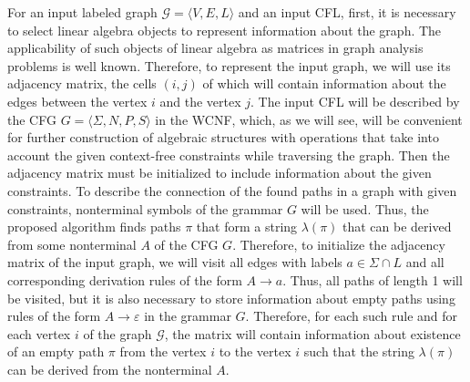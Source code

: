 For an input labeled graph $\mathcal{G} = \langle V, E, L\rangle$ and an input CFL, first, it is necessary to select linear algebra objects to represent information about the graph. The applicability of such objects of linear algebra as matrices in graph analysis problems is well known. Therefore, to represent the input graph, we will use its adjacency matrix, the cells $(i, j)$ of which will contain information about the edges between the vertex $i$ and the vertex $j$. The input CFL will be described by the CFG $G = \langle \Sigma, N, P, S \rangle$ in the WCNF, which, as we will see, will be convenient for further construction of algebraic structures with operations that take into account the given context-free constraints while traversing the graph. Then the adjacency matrix must be initialized to include information about the given constraints. To describe the connection of the found paths in a graph with given constraints, nonterminal symbols of the grammar $G$ will be used. Thus, the proposed algorithm finds paths $\pi$ that form a string $\lambda(\pi)$ that can be derived from some nonterminal $A$ of the CFG $G$. Therefore, to initialize the adjacency matrix of the input graph, we will visit all edges with labels $a \in \Sigma \cap L$ and all corresponding derivation rules of the form $A \rightarrow a$. Thus, all paths of length 1 will be visited, but it is also necessary to store information about empty paths using rules of the form $A \rightarrow \varepsilon$ in the grammar $G$. Therefore, for each such rule and for each vertex $i$ of the graph $\mathcal{G}$, the matrix will contain information about existence of an empty path $\pi$ from the vertex $i$ to the vertex $i$ such that the string $\lambda(\pi)$ can be derived from the nonterminal $A$.

